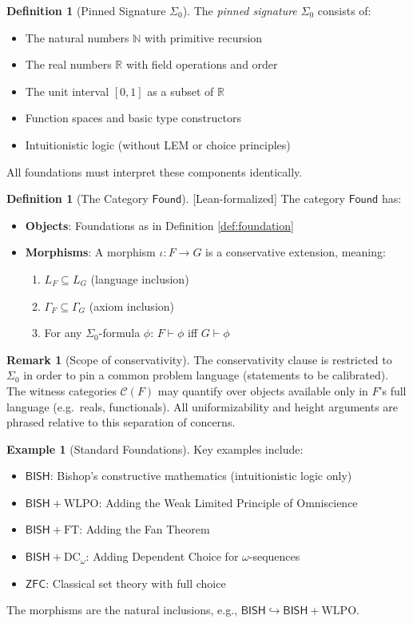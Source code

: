 \documentclass[11pt]{article}
\theoremstyle{plain}
\theoremstyle{definition}
\newtheorem{definition}[theorem]{Definition}
\newtheorem{example}[theorem]{Example}
\newtheorem{remark}[theorem]{Remark}
\newcommand{\N}{\mathbb{N}}
\newcommand{\R}{\mathbb{R}}
\newcommand{\WLPO}{\mathrm{WLPO}}
\newcommand{\FT}{\mathrm{FT}}
\newcommand{\DCw}{\mathrm{DC}_\omega}
\newcommand{\BISH}{\mathsf{BISH}}
\newcommand{\ZFC}{\mathsf{ZFC}}
\newcommand{\Found}{\mathsf{Found}}
\newcommand{\SigmaZero}{\Sigma_{0}}
\newcommand{\leanok}{\textsf{\textcolor{green!70!black}{[Lean-formalized]}}}
\begin{document}
\begin{definition}[Pinned Signature $\SigmaZero$]\label{def:sigma0}
The \emph{pinned signature} $\SigmaZero$ consists of:
\begin{itemize}
\item The natural numbers $\N$ with primitive recursion
\item The real numbers $\R$ with field operations and order
\item The unit interval $[0,1]$ as a subset of $\R$
\item Function spaces and basic type constructors
\item Intuitionistic logic (without LEM or choice principles)
\end{itemize}
All foundations must interpret these components identically.
\end{definition}

\begin{definition}[The Category $\Found$] \leanok
The category $\Found$ has:
\begin{itemize}
\item \textbf{Objects}: Foundations as in Definition \ref{def:foundation}
\item \textbf{Morphisms}: A morphism $\iota: F \to G$ is a conservative extension, meaning:
  \begin{enumerate}
  \item $L_F \subseteq L_G$ (language inclusion)
  \item $\Gamma_F \subseteq \Gamma_G$ (axiom inclusion)
  \item For any $\SigmaZero$-formula $\phi$: $F \vdash \phi$ iff $G \vdash \phi$
  \end{enumerate}
\end{itemize}
\end{definition}

\begin{remark}[Scope of conservativity]\label{rem:conservativity-scope}
The conservativity clause is restricted to $\SigmaZero$ in order to pin a common problem language (statements to be calibrated). The witness categories $\mathcal C(F)$ may quantify over objects available only in $F$'s full language (e.g.\ reals, functionals). All uniformizability and height arguments are phrased relative to this separation of concerns.
\end{remark}

\begin{example}[Standard Foundations]
Key examples include:
\begin{itemize}
\item $\BISH$: Bishop's constructive mathematics (intuitionistic logic only)
\item $\BISH + \WLPO$: Adding the Weak Limited Principle of Omniscience
\item $\BISH + \FT$: Adding the Fan Theorem
\item $\BISH + \DCw$: Adding Dependent Choice for $\omega$-sequences
\item $\ZFC$: Classical set theory with full choice
\end{itemize}
The morphisms are the natural inclusions, e.g., $\BISH \hookrightarrow \BISH + \WLPO$.
\end{example}
\end{document}
